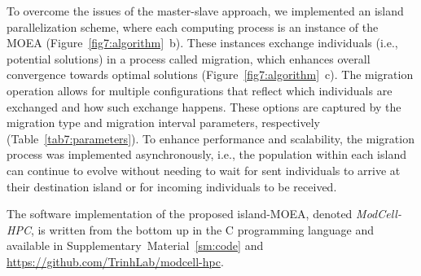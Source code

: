 {To overcome the issues of the master-slave approach, we implemented an island parallelization scheme, where each computing process is an instance of the MOEA (Figure~\ref{fig7:algorithm}~b).
These instances exchange individuals (i.e., potential solutions) in a process called migration, which enhances overall convergence towards optimal solutions (Figure~\ref{fig7:algorithm}~c).
The migration operation allows for multiple configurations that reflect which individuals are exchanged and how such exchange happens.
These options are captured by the migration type and migration interval parameters, respectively (Table~\ref{tab7:parameters}).
To enhance performance and scalability, the migration process was implemented asynchronously, i.e., the population within each island can continue to evolve without needing to wait for sent individuals to arrive at their destination island or for incoming individuals to be received.

The software implementation of the proposed island-MOEA, denoted \textit{ModCell-HPC}, is written from the bottom up in the C programming language and available in Supplementary~Material~\ref{sm:code} and \url{https://github.com/TrinhLab/modcell-hpc}.





}
